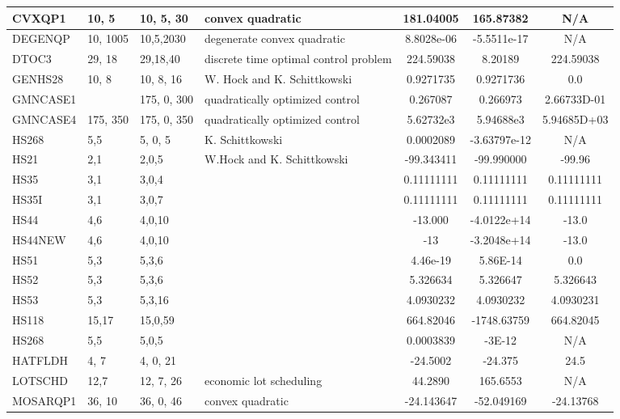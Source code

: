 \documentclass{article}
\begin{document}
\begin{tabular}{l | l |   >{\footnotesize}p{1.8cm} |  >{\footnotesize}p{2.1cm} | c | c | c  }
CVXQP1  & 10, 5 & 10, 5, 30  & convex quadratic & 181.04005 & 165.87382  & N/A   \\ \hline
DEGENQP & 10, 1005 & 10,5,2030  & degenerate convex quadratic & 8.8028e-06 & -5.5511e-17  & N/A \\ \hline
DTOC3   & 29, 18  & 29,18,40 & discrete time optimal control problem &  224.59038 & 8.20189  & 224.59038 \\ \hline 
GENHS28 & 10, 8  & 10, 8, 16  & W. Hock and K. Schittkowski & 0.9271735  & 0.9271736  & 0.0   \\ \hline
GMNCASE1 &        & 175, 0, 300  &     quadratically optimized control   &     0.267087  & 0.266973             &    2.66733D-01   \\ \hline
GMNCASE4 & 175, 350 & 175, 0, 350  &  quadratically optimized control &  5.62732e3 &  5.94688e3 &    5.94685D+03 \\ \hline 
HS268   & 5,5  & 5, 0, 5  & K. Schittkowski   & 0.0002089   & -3.63797e-12      &    N/A    \\ \hline 
HS21    &  2,1 & 2,0,5   & W.Hock and K. Schittkowski  & -99.343411  & -99.990000  & -99.96    \\ \hline 
HS35   &  3,1  & 3,0,4  &                 & 0.11111111  & 0.11111111   &   0.11111111   \\ \hline 
HS35I   &  3,1  & 3,0,7  &                 & 0.11111111  & 0.11111111   &   0.11111111   \\ \hline 
HS44   & 4,6   & 4,0,10   &  	       &  -13.000 & -4.0122e+14 & -13.0    \\ \hline
HS44NEW & 4,6  & 4,0,10  &       & -13     & -3.2048e+14   & -13.0    \\ \hline
HS51    &  5,3   & 5,3,6    &  & 4.46e-19   & 5.86E-14     & 0.0    \\ \hline
HS52    &  5,3  & 5,3,6   & & 5.326634   & 5.326647   & 5.326643   \\ \hline
HS53    &  5,3  & 5,3,16    & & 4.0930232  & 4.0930232  &4.0930231  \\ \hline
HS118  & 15,17  & 15,0,59  & & 664.82046  & -1748.63759  & 664.82045    \\ \hline
HS268  & 5,5  & 5,0,5  & & 0.0003839 & -3E-12  & N/A   \\ \hline
HATFLDH  & 4, 7 &  4, 0, 21  & & -24.5002  & -24.375 & 24.5   \\ \hline
LOTSCHD  & 12,7  &  12, 7, 26 & economic lot scheduling & 44.2890 & 165.6553  & N/A  \\ \hline
MOSARQP1 & 36, 10 & 36, 0, 46 &convex quadratic &  -24.143647 & -52.049169 & -24.13768 \\ \hline

\end{tabular}
\end{document}
